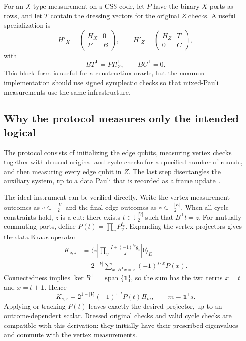 \documentclass[11pt,a4paper]{article}
\newcommand{\F}{\mathbb{F}_2}
\newcommand{\Span}{\operatorname{span}}
\begin{document}
For an $X$-type measurement on a CSS code, let $P$ have the binary $X$ ports as rows, and let $T$ contain the dressing vectors for the original $Z$ checks. A useful specialization is
\begin{equation}
 H'_X=\begin{pmatrix}H_X&0\\P&B\end{pmatrix},\qquad
 H'_Z=\begin{pmatrix}H_Z&T\\0&C\end{pmatrix},
 \label{eq:css}
\end{equation}
with
\begin{equation}
 BT^{\mathsf T}=P H_Z^{\mathsf T},\qquad BC^{\mathsf T}=0.
\end{equation}
This block form is useful for a construction oracle, but the common implementation should use signed symplectic checks so that mixed-Pauli measurements use the same infrastructure.

\subsection{Why the protocol measures only the intended logical}

The protocol consists of initializing the edge qubits, measuring vertex checks together with dressed original and cycle checks for a specified number of rounds, and then measuring every edge qubit in $Z$. The last step disentangles the auxiliary system, up to a data Pauli that is recorded as a frame update~\cite{gauging,tdg}.

The ideal instrument can be verified directly. Write the vertex measurement outcomes as $s\in\F^{|V|}$ and the final edge outcomes as $z\in\F^{|E|}$. When all cycle constraints hold, $z$ is a cut: there exists $t\in\F^{|V|}$ such that $B^{\mathsf T}t=z$. For mutually commuting ports, define $P(t)=\prod_v P_v^{t_v}$. Expanding the vertex projectors gives the data Kraus operator
\begin{align}
 K_{s,z}
 &=\langle z|\prod_v\frac{I+(-1)^{s_v}g_v}{2}|0\rangle_E\\
 &=2^{-|V|}\sum_{x:\,B^{\mathsf T}x=z}(-1)^{s\cdot x}P(x).
\end{align}
Connectedness implies $\ker B^{\mathsf T}=\Span\{\boldsymbol1\}$, so the sum has the two terms $x=t$ and $x=t+\boldsymbol1$. Hence
\begin{equation}
 K_{s,z}=2^{1-|V|}(-1)^{s\cdot t}P(t)\Pi_m,
 \qquad m=\boldsymbol1^{\mathsf T}s.
 \label{eq:kraus}
\end{equation}
Applying or tracking $P(t)$ leaves exactly the desired projector, up to an outcome-dependent scalar. Dressed original checks and valid cycle checks are compatible with this derivation: they initially have their prescribed eigenvalues and commute with the vertex measurements.
\end{document}
